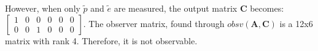 However, when only $\tilde{p}$ and $\tilde{e}$ are measured, the
output matrix $\bm{C}$ becomes:
$\begin{bmatrix}
  1 & 0 & 0 & 0 & 0 & 0 \\
  0 & 0 & 1 & 0 & 0 & 0
\end{bmatrix}$.
The observer matrix, found through $obsv(\bm{A},\bm{C})$ is a 12x6
matrix with rank 4. Therefore, it is not observable.
